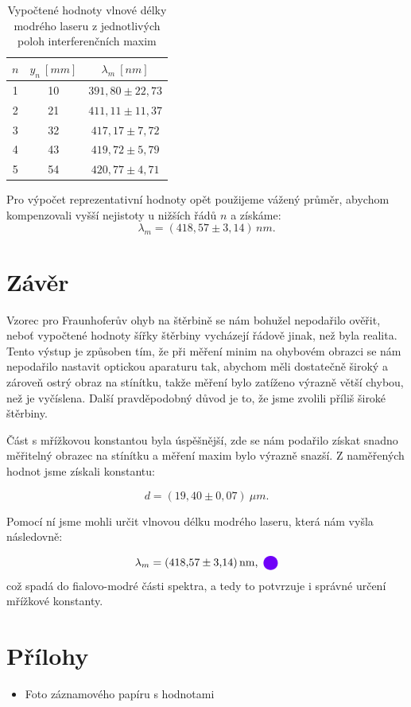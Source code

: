 \documentclass[a4paper,12pt]{article}
\newcommand{\colorcircle}[1]{%
  \tikz[baseline=-0.6ex]\draw[fill=#1,draw=none] (0,0) circle (1.5ex);%
}
\begin{document}
\begin{table}[H]
\centering
\renewcommand{\arraystretch}{1.5}
\begin{tabular}{|c|c|c|}
\hline
$n$ & $y_n\ \unit{[mm]}$ & $\lambda_m\ \unit{[nm]}$ \\
\hline
1 & 10 & $391{,}80 \pm 22{,}73$ \\
\hline
2 & 21 & $411{,}11 \pm 11{,}37$ \\
\hline
3 & 32 & $417{,}17 \pm 7{,}72$ \\
\hline
4 & 43 & $419{,}72 \pm 5{,}79$ \\
\hline
5 & 54 & $420{,}77 \pm 4{,}71$ \\
\hline
\end{tabular}
\caption{Vypočtené hodnoty vlnové délky modrého laseru z jednotlivých poloh interferenčních maxim}
\label{tab:lambda_modry}
\end{table}

Pro výpočet reprezentativní hodnoty opět použijeme vážený průměr, abychom kompenzovali vyšší nejistoty u nižších řádů $n$ a získáme:
$$
\lambda_m = (418{,}57 \pm 3{,}14)\,\unit{nm}. 
$$

\section{Závěr}
Vzorec pro Fraunhoferův ohyb na štěrbině se nám bohužel nepodařilo ověřit, neboť vypočtené hodnoty šířky štěrbiny vycházejí řádově jinak, než byla realita. Tento výstup je způsoben tím, že při měření minim na ohybovém obrazci se nám nepodařilo nastavit optickou aparaturu tak, abychom měli dostatečně široký a zároveň ostrý obraz na stínítku, takže měření bylo zatíženo výrazně větší chybou, než je vyčíslena. Další pravděpodobný důvod je to, že jsme zvolili příliš široké štěrbiny. 

Část s mřížkovou konstantou byla úspěšnější, zde se nám podařilo získat snadno měřitelný obrazec na stínítku a měření maxim bylo výrazně snazší. Z naměřených hodnot jsme získali konstantu:

$$
d=(19,40\pm 0,07)\ \unit{\mu m}.
$$

Pomocí ní jsme mohli určit vlnovou délku modrého laseru, která nám vyšla následovně:

$$
\lambda_m = (418{,}57 \pm 3{,}14)\,\unit{nm},\ \colorcircle{myblue}
$$
což spadá do fialovo-modré části spektra, a tedy to potvrzuje i správné určení mřížkové konstanty. 

\newpage

\section{Přílohy}
\begin{itemize}
    \item Foto záznamového papíru s hodnotami
\end{itemize}
\end{document}
